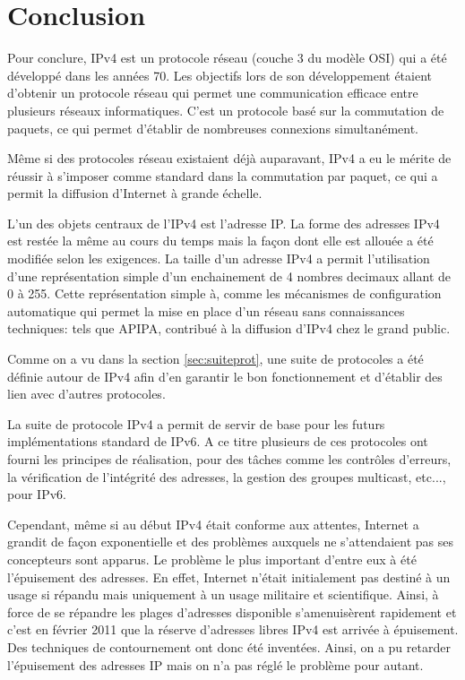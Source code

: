 \section{Conclusion}

Pour conclure, IPv4 est un protocole réseau (couche 3 du modèle OSI) qui a
été développé dans les années 70. Les objectifs lors de son développement
étaient d'obtenir un protocole réseau qui permet une communication efficace
entre plusieurs réseaux informatiques. C'est un protocole basé sur la
commutation de paquets, ce qui permet d'établir de nombreuses connexions
simultanément. 

\smallbreak
Même si des protocoles réseau existaient déjà auparavant, IPv4 a eu le mérite
de réussir à s'imposer comme standard dans la commutation par paquet, ce qui a
permit la diffusion d'Internet à grande échelle.

\smallbreak
L'un des objets centraux de l'IPv4 est l'adresse IP.  La forme des adresses
IPv4 est restée la même au cours du temps mais la façon dont elle est allouée a
été modifiée selon les exigences.  La taille d'un adresse IPv4 a permit
l'utilisation d'une représentation simple d'un enchainement de 4 nombres
decimaux allant de 0 à 255.  Cette représentation simple à, comme les
mécanismes de configuration automatique qui permet la mise en place d'un réseau
sans connaissances techniques: tels que APIPA, contribué à la diffusion
d'IPv4 chez le grand public.
\smallbreak

Comme on a vu dans la section \ref{sec:suiteprot}, une suite de protocoles a
été définie autour de IPv4 afin d'en garantir le bon fonctionnement et d'établir
des lien avec d'autres protocoles.

La suite de protocole IPv4 a permit de servir de base pour les futurs
implémentations standard de IPv6. A ce titre plusieurs de ces protocoles ont
fourni les principes de réalisation, pour des tâches comme les contrôles d'erreurs,
la vérification de l'intégrité des adresses, la gestion des groupes multicast,
etc..., pour IPv6.
\smallbreak


Cependant, même si au début IPv4 était conforme aux attentes, Internet a
grandit de façon exponentielle et des problèmes auxquels ne s'attendaient pas
ses concepteurs sont apparus.
Le problème le plus important d'entre eux à été l'épuisement des adresses. En
effet, Internet n'était initialement pas destiné à un usage si répandu mais
uniquement à un usage militaire et scientifique.  Ainsi, à force de se répandre
les plages d'adresses disponible s'amenuisèrent rapidement et c'est en février
2011 que la réserve d'adresses libres IPv4 est
arrivée à épuisement. Des techniques de contournement ont donc été inventées.
Ainsi, on a pu retarder l'épuisement des adresses IP mais on n'a pas réglé le
problème pour autant.

